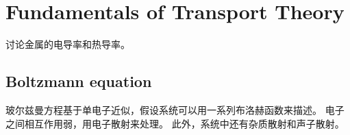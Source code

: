 \section{Fundamentals of Transport Theory}

讨论金属的电导率和热导率。

\subsection{Boltzmann equation}

玻尔兹曼方程基于单电子近似，假设系统可以用一系列布洛赫函数来描述。
电子之间相互作用弱，用电子散射来处理。
此外，系统中还有杂质散射和声子散射。



